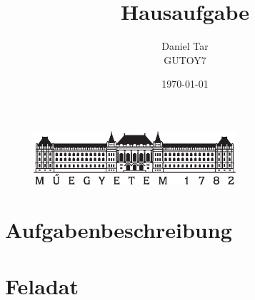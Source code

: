 \documentclass{article}
\begin{document}
	
	\begin{titlepage}
		\setlength{\headheight}{20pt}
		\title{\huge Hausaufgabe
		}
		\author{Daniel Tar\\GUTOY7}
		\date{\today}
		\maketitle
		\thispagestyle{fancy}
		
		\begin{figure}
			\begin{center}
				\includegraphics[height=2cm]{logo_bme_kicsi.eps}
			\end{center}
		\end{figure}
		
	\end{titlepage}
	\newpage
	
	
	\newpage
	
	
	\setlength{\headheight}{0pt}
	\tableofcontents
	
	\setcounter{page}{1}

%
%

	\section{Aufgabenbeschreibung}
	
	\section{Feladat}
	
\end{document}

